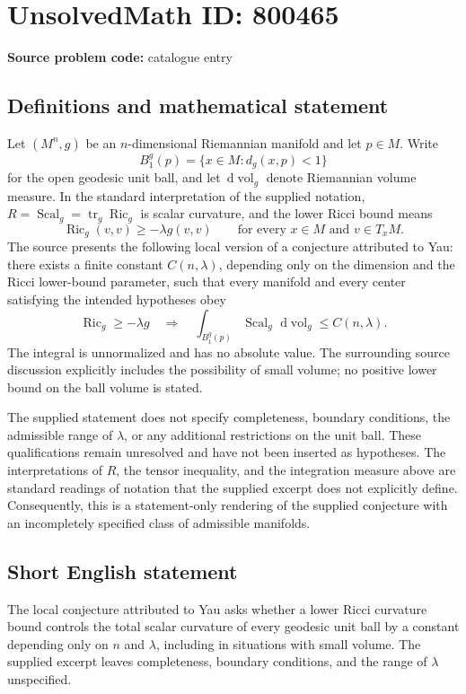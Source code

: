 \documentclass[11pt]{article}
\newcommand{\dd}{\,\mathrm{d}}
\begin{document}
\section*{UnsolvedMath ID: 800465}
\textbf{Source problem code:} catalogue entry
\subsection{Definitions and mathematical statement}
Let \((M^n,g)\) be an \(n\)-dimensional Riemannian manifold and let \(p\in M\). Write
\[
B_1^g(p)=\{x\in M:d_g(x,p)<1\}
\]
for the open geodesic unit ball, and let \(\dd\operatorname{vol}_g\) denote Riemannian volume measure. In the standard interpretation of the supplied notation, \(R=\operatorname{Scal}_g=\operatorname{tr}_g\operatorname{Ric}_g\) is scalar curvature, and the lower Ricci bound means
\[
\operatorname{Ric}_g(v,v)\geq-\lambda g(v,v)
\qquad\text{for every }x\in M\text{ and }v\in T_xM.
\]
The source presents the following local version of a conjecture attributed to Yau: there exists a finite constant \(C(n,\lambda)\), depending only on the dimension and the Ricci lower-bound parameter, such that every manifold and every center satisfying the intended hypotheses obey
\[
\operatorname{Ric}_g\geq-\lambda g
\quad\Longrightarrow\quad
\int_{B_1^g(p)}\operatorname{Scal}_g\,\dd\operatorname{vol}_g
\leq C(n,\lambda).
\]
The integral is unnormalized and has no absolute value. The surrounding source discussion explicitly includes the possibility of small volume; no positive lower bound on the ball volume is stated.

The supplied statement does not specify completeness, boundary conditions, the admissible range of \(\lambda\), or any additional restrictions on the unit ball. These qualifications remain unresolved and have not been inserted as hypotheses. The interpretations of \(R\), the tensor inequality, and the integration measure above are standard readings of notation that the supplied excerpt does not explicitly define. Consequently, this is a statement-only rendering of the supplied conjecture with an incompletely specified class of admissible manifolds.
\subsection{Short English statement}
The local conjecture attributed to Yau asks whether a lower Ricci curvature bound controls the total scalar curvature of every geodesic unit ball by a constant depending only on \(n\) and \(\lambda\), including in situations with small volume. The supplied excerpt leaves completeness, boundary conditions, and the range of \(\lambda\) unspecified.
\end{document}
